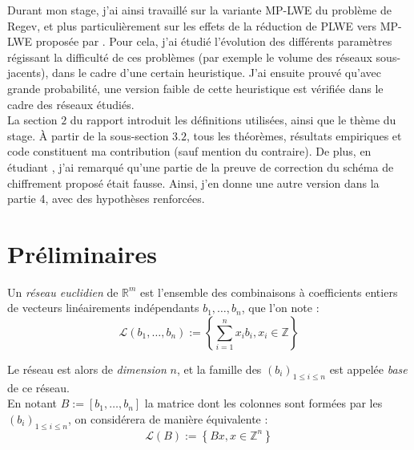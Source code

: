 \documentclass[11pt,a4paper]{article}
\begin{document}
Durant mon stage, j'ai ainsi travaillé sur la variante MP-LWE du problème de Regev, et plus particulièrement sur les effets de la réduction de PLWE vers MP-LWE proposée par \cite{mplwe}. Pour cela, j'ai étudié l'évolution des différents paramètres régissant la difficulté de ces problèmes (par exemple le volume des réseaux sous-jacents), dans le cadre d'une certain heuristique. J'ai ensuite prouvé qu'avec grande probabilité, une version faible de cette heuristique est vérifiée dans le cadre des réseaux étudiés. \\

La section $2$ du rapport introduit les définitions utilisées, ainsi que le thème du stage. À partir de la sous-section $3.2$, tous les théorèmes, résultats empiriques et code constituent ma contribution (sauf mention du contraire). De plus, en étudiant \cite{mplwe}, j'ai remarqué qu'une partie de la preuve de correction du schéma de chiffrement proposé était fausse. Ainsi, j'en donne une autre version dans la partie 4, avec des hypothèses renforcées.

\section{Préliminaires}
\begin{defin} 
Un \textit{réseau euclidien} de $\mathbb{R}^m$ est l'ensemble des combinaisons à coefficients entiers de vecteurs linéairements indépendants $b_1, \dots, b_n$, que l'on note :
\[\mathcal{L}(b_1,\dots,b_n) := \left\{ \sum_{i=1}^n x_ib_i, x_i \in \mathbb{Z} \right\} \]

Le réseau est alors de \textit{dimension} $n$, et la famille des $(b_i)_{1\leq i \leq n}$ est appelée \textit{base} de ce réseau. \\

En notant $B:=[b_1,\dots,b_n]$ la matrice dont les colonnes sont formées par les $(b_i)_{1\leq i \leq n}$, on considérera de manière équivalente : \[\mathcal{L}(B) := \left\{ Bx, x \in \mathbb{Z}^n \right\} \]
\end{defin}
\end{document}
